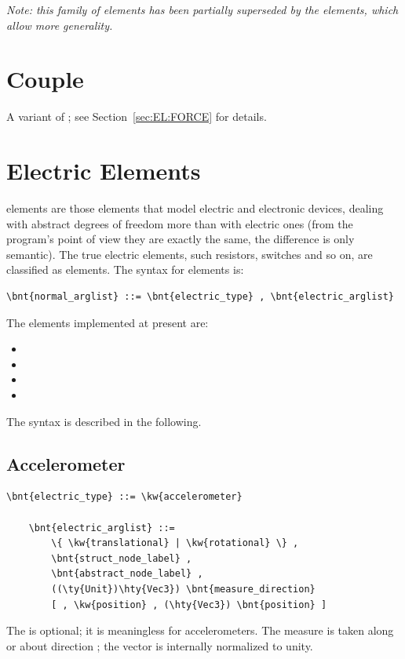{\em Note: this family of elements has been partially superseded by the
 elements, which allow more generality.}




\section{Couple}
A variant of ; see Section~\ref{sec:EL:FORCE} for details.




\section{Electric Elements}
 elements are those elements that model electric and electronic
devices, dealing with abstract degrees of freedom more than with electric
ones (from the program's point of view they are exactly the same, the
difference is only semantic). The true electric elements, such resistors,
switches and so on, are classified as  elements.
The syntax for  elements is:
\begin{Verbatim}[commandchars=\\\{\}]
    \bnt{normal_arglist} ::= \bnt{electric_type} , \bnt{electric_arglist}
\end{Verbatim}
The  elements implemented at present are:
\begin{itemize}
	\item {}
	\item {}
	\item {}
	\item {}
\end{itemize}
The syntax is described in the following.

\subsection{Accelerometer}
\begin{Verbatim}[commandchars=\\\{\}]
    \bnt{electric_type} ::= \kw{accelerometer}

    \bnt{electric_arglist} ::=
        \{ \kw{translational} | \kw{rotational} \} ,
        \bnt{struct_node_label} ,
        \bnt{abstract_node_label} ,
        ((\ty{Unit})\hty{Vec3}) \bnt{measure_direction}
        [ , \kw{position} , (\hty{Vec3}) \bnt{position} ]
\end{Verbatim}
The  is optional; it is meaningless for 
accelerometers.
The measure is taken along or about direction ;
the vector is internally normalized to unity.

